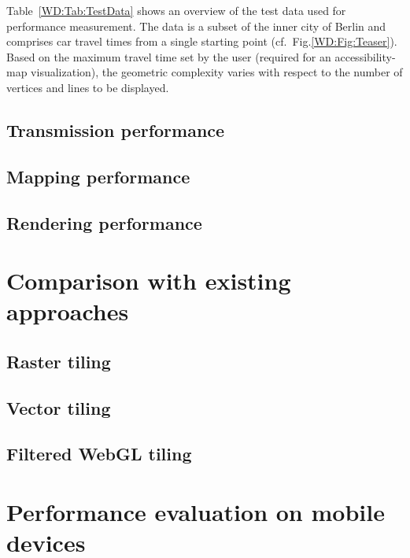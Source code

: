       Table~\ref{WD:Tab:TestData} shows an overview of the test data used for performance
      measurement. The data is a subset of the inner city of Berlin and comprises car
      travel times from a single starting point (cf.~Fig.\ref{WD:Fig:Teaser}). Based on
      the maximum travel time set by the user (required for an accessibility-map visualization),
      the geometric complexity varies with respect to the number of vertices and lines
      to be displayed.\par
    \subsection{Transmission performance}
    \subsection{Mapping performance}
    \subsection{Rendering performance}
  \section{Comparison with existing approaches}
    \subsection{Raster tiling}
    \subsection{Vector tiling}
    \subsection{Filtered WebGL tiling}
  \section{Performance evaluation on mobile devices}
